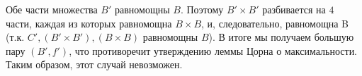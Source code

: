 Обе части множества $B'$ равномощны $B$. Поэтому $B' \times B'$ разбивается на $4$ части, каждая из которых равномощна $B \times B$, и, следовательно, равномощна B (т.к. $C', (B' \times B'), (B \times B)$  равномощны $B$). В итоге мы получаем большую пару $(B', f')$, что противоречит утверждению леммы Цорна о максимальности. Таким образом, этот случай невозможен.